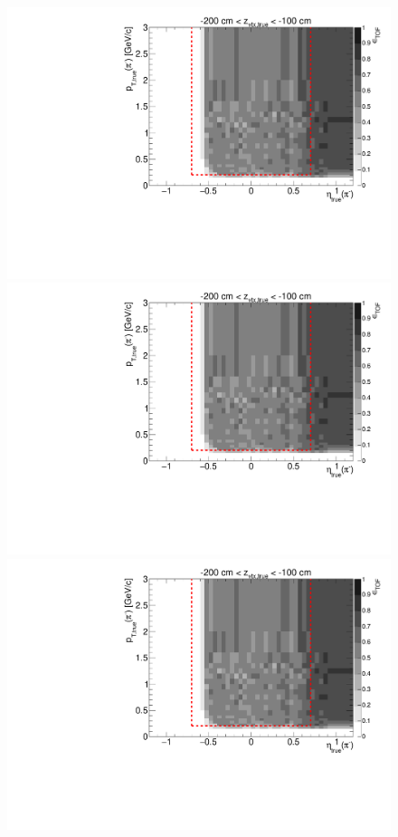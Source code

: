 \begin{figure}[hb]
{  \includegraphics[width=\linewidth,page=5]{graphics/eff/Eff2D_TOF_pion_Minus.pdf}\\
  \includegraphics[width=\linewidth,page=7]{graphics/eff/Eff2D_TOF_pion_Minus.pdf}\\
  \includegraphics[width=\linewidth,page=9]{graphics/eff/Eff2D_TOF_pion_Minus.pdf}
}
\end{figure}
